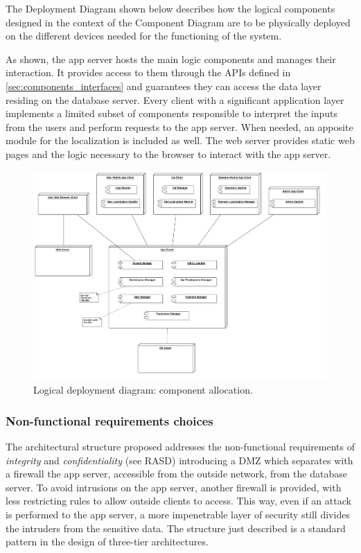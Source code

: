 The Deployment Diagram shown below describes how the logical components designed in the context of the Component Diagram are to be physically deployed on the different devices needed for the functioning of the system.

As shown, the app server hosts the main logic components and manages their interaction. It provides access to them through the APIs defined in \autoref{sec:components_interfaces} and guarantees they can access the data layer residing on the database server.\newline
Every client with a significant application layer implements a limited subset of components responsible to interpret the inputs from the users and perform requests to the app server. When needed, an apposite module for the localization is included as well.\newline
The web server provides static web pages and the logic necessary to the browser to interact with the app server.

\begin{figure}
	\includegraphics[width=\hsize, center]{img/deployment_diagrams/global.png}
	\caption{Logical deployment diagram: component allocation.}
\end{figure}

\subsubsection{Non-functional requirements choices}
	The architectural structure proposed addresses the non-functional requirements of \textit{integrity} and \textit{confidentiality} (see RASD) introducing a DMZ which separates with a firewall the app server, accessible from the outside network, from the database server. To avoid intrusions on the app server, another firewall is provided, with less restricting rules to allow outside clients to access. This way, even if an attack is performed to the app server, a more impenetrable layer of security still divides the intruders from the sensitive data. The structure just described is a standard pattern in the design of three-tier architectures.

